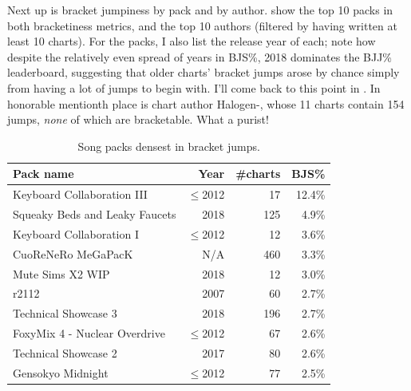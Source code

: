 \documentclass[10pt]{sigplanconf}
\begin{document}
Next up is bracket jumpiness by pack and by author.
 show the top 10 packs in both bracketiness metrics,
and  the top 10 authors
(filtered by having written at least 10 charts).
For the packs, I also list the release year of each;
note how despite the relatively even spread of years in BJS\%,
2018 dominates the BJJ\% leaderboard,
suggesting that older charts' bracket jumps arose by chance simply from having a lot of jumps to begin with.
I'll come back to this point in .
In honorable mentionth place is chart author Halogen-, whose 11 charts contain 154 jumps, \textit{none} of which are bracketable.
What a purist!

\begin{table}[t]
	\begin{center}
		\small
	\begin{tabular}{l|r|r|r}
		\bf Pack name & \bf Year & \bf \#charts & \bf BJS\% \\
		\hline
		Keyboard Collaboration III		& $\le$2012	&  17 & 12.4\% \\
		Squeaky Beds and Leaky Faucets		& 2018	& 125 &  4.9\% \\
		Keyboard Collaboration I		& $\le$2012	&  12 &  3.6\% \\
		CuoReNeRo MeGaPacK			& N/A	& 460 &  3.3\% \\
		Mute Sims X2 WIP			& 2018	&  12 &  3.0\% \\
		r2112					& 2007	&  60 &  2.7\% \\
		Technical Showcase 3			& 2018	& 196 &  2.7\% \\
		FoxyMix 4 - Nuclear Overdrive		& $\le$2012	&  67 &  2.6\% \\
		Technical Showcase 2			& 2017	&  80 &  2.6\% \\
		Gensokyo Midnight			& $\le$2012 	&  77 &  2.5\% \\
	\end{tabular}
	\end{center}
	\caption{Song packs densest in bracket jumps.}
	\label{tab:pack-bjs}
\end{table}
\end{document}
